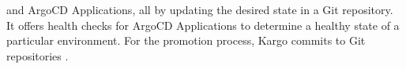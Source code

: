 and ArgoCD Applications, all by updating the desired state in a Git repository.
It offers health checks for ArgoCD Applications to determine a healthy state of a particular environment.
For the promotion process, Kargo commits to Git repositories
\autocite{kargoAkuityWebsite}.
%
%
%
%
%
%
%
%

